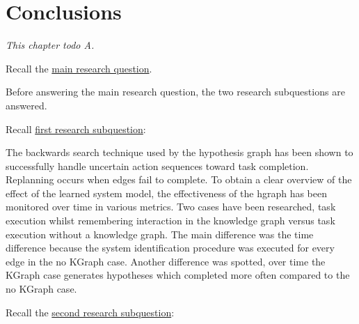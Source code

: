 \chapter{Conclusions}%
\label{chap:conclusion}
\textit{This chapter todo A.\bs}

Recall the \hyperref[researchquestion:main]{main research question}. \vspace{0.5\baselineskip}\\
\textit{\indent{}}\vspace{\baselineskip}

\noindent Before answering the main research question, the two research subquestions are answered.\vspace{\baselineskip}

\noindent Recall \hyperref[researchsubquestion:does_it_work]{first research subquestion}:\vspace{0.5\baselineskip}\\
\textit{\indent{}}\vspace{0.5\baselineskip}

\noindent The backwards search technique used by the hypothesis graph has been shown to successfully handle uncertain action sequences toward task completion. Replanning occurs when edges fail to complete. To obtain a clear overview of the effect of the learned system model, the effectiveness of the hgraph has been monitored over time in various metrics. Two cases have been researched, task execution whilst remembering interaction in the knowledge graph versus task execution without a knowledge graph. The main difference was the time difference because the system identification procedure was executed for every edge in the no KGraph case. Another difference was spotted, over time the KGraph case generates hypotheses which completed more often compared to the no KGraph case. \vspace{\baselineskip}


\noindent Recall the \hyperref[researchsubquestion:does_it_compare]{second research subquestion}:\vspace{0.5\baselineskip}\\
\textit{}\vspace{0.5\baselineskip}

